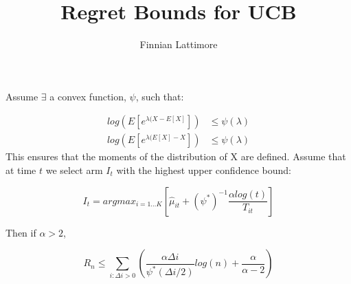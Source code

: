 \documentclass{article}
\title{Regret Bounds for UCB}
\author{Finnian Lattimore}
\theoremstyle{plain}
\theoremstyle{definition}
\begin{document}
\def\ci{\perp\!\!\!\perp}
\maketitle


Assume $\exists$ a convex function, $\psi$, such that:

\begin{equation}
\begin{aligned}
log(E[e^{\lambda(X-E[X]}]) & \leq \psi(\lambda)\\
log(E[e^{\lambda(E[X]-X}]) & \leq \psi(\lambda)
\end{aligned}
\end{equation}
This ensures that the moments of the distribution of X are defined. Assume that at time $t$ we select arm $I_t$ with the highest upper confidence bound:

\begin{equation}
\label{eq:armSelection}
I_{t} = argmax_{i=1...K}\left[\hat{\mu}_{it} + (\psi^{*})^{-1}\frac{\alpha log(t)}{T_{it}}\right]
\end{equation}

Then if $\alpha > 2$,

\begin{equation}
R_n \leq \sum_{i:\Delta i > 0}\left(\frac{\alpha \Delta i}{\psi^{*}(\Delta i/2)}log(n)+\frac{\alpha}{\alpha-2}\right)
\end{equation}
\end{document}
